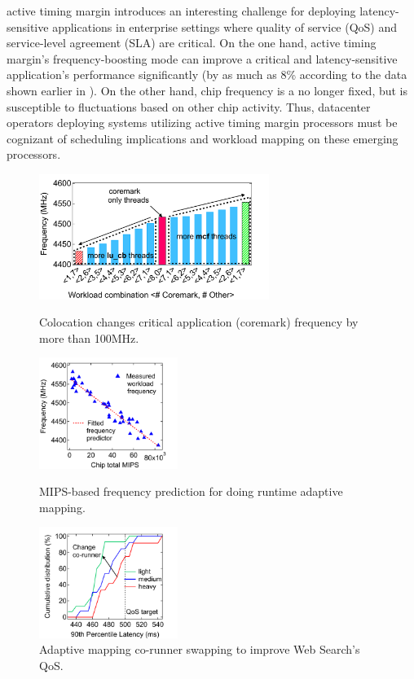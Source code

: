 active timing margin introduces an interesting challenge for deploying latency-sensitive applications in enterprise settings where quality of service (QoS) and service-level agreement (SLA) are critical. On the one hand, active timing margin's frequency-boosting mode can improve a critical and latency-sensitive application's performance significantly (by as much as 8\% according to the data shown earlier in ). On the other hand, chip frequency is a no longer fixed, but is susceptible to fluctuations based on other chip activity. Thus, datacenter operators deploying systems utilizing active timing margin processors must be cognizant of scheduling implications and workload mapping on these emerging processors.
\begin{figure}[t]
  \centering
  \begin{minipage}{0.44\linewidth}
    \centering
                \includegraphics[trim=0 0 0 0,clip,height=1.6in]{graphs/coremark_freq.pdf}
                \caption{Colocation changes critical application (coremark) frequency by more than 100MHz.}
                \label{fig:coremark-freq-vary}
  \end{minipage}
\hfill
  \begin{minipage}{0.24\linewidth}
    \centering
                \includegraphics[trim=0 0 65 0,clip,height=1.42in]{graphs/mips_freq.pdf}
                \caption{MIPS-based frequency prediction for doing runtime adaptive mapping.}
                \label{fig:mips-predict}
  \end{minipage}
\hfill
  \begin{minipage}{0.24\linewidth}
    \centering
                \includegraphics[trim=0 0 65 0,clip,height=1.42in]{graphs/websearch-tail-cdf.pdf}
                \caption{Adaptive mapping co-runner swapping to improve Web Search's QoS.}
                \label{fig:tail-cdf}
  \end{minipage}
\end{figure}

